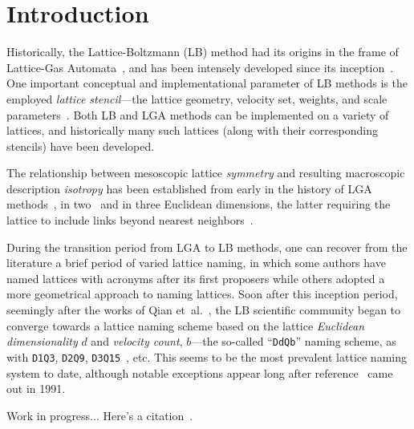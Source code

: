 \section{Introduction}

    Historically,   the   Lattice-Boltzmann   (LB)    method    had    its    origins    in    the    frame    of    Lattice-Gas
    Automata~\cite{1988-McNamaraGR+ZanettiG-PhysRevLett},     and     has     been     intensely     developed     since     its
    inception~\cite{2018-KrugerT+ViggenEM-Springer}. One important conceptual and implementational parameter of  LB  methods  is
    the    employed    \emph{lattice    stencil}---the    lattice    geometry,    velocity    set,    weights,     and     scale
    parameters~\cite{2013-HegeleJr+PhilippiPC-JSciComput,                                2013-MattilaKK+PhilippiPC-IntJModPhysC,
    2014-MattilaKK+PhilippiPC-SciWorldJ}. Both LB and LGA methods can be implemented on a variety of lattices, and  historically
    many such lattices (along with their corresponding stencils) have been developed.

    The relationship between mesoscopic lattice \emph{symmetry} and resulting macroscopic description \emph{isotropy}  has  been
    established from early in the history of LGA methods~\cite{1973-HardyJ+PazzisO-JMathPhys, 1976-HardyJ+PomeauY-PhysRevA},  in
    two~\cite{1986-FrischU+PomeauY-PhysRevLett} and in three Euclidean dimensions, the latter requiring the lattice  to  include
    links beyond nearest neighbors~\cite[p.~473]{1986-WolframS-JStatPhys}.

    During the transition period from LGA to LB methods, one can recover from the literature a brief period  of  varied  lattice
    naming, in which some authors have named lattices with acronyms after its  first  proposers  while  others  adopted  a  more
    geometrical  approach  to  naming  lattices.  Soon  after  this  inception  period,  seemingly  after  the  works  of   Qian
    et~al.~\cite{1991-QianYH+LallemandP-AdvKinTheoContMech, 1992-QianYH+LallemandP-EurophysLett}, the  LB  scientific  community
    began to  converge  towards  a  lattice  naming  scheme  based  on  the  lattice  \emph{Euclidean  dimensionality}  $d$  and
    \emph{velocity  count},  $b$---the  so-called  ``\texttt{DdQb}''  naming  scheme,  as  with  \texttt{D1Q3},   \texttt{D2Q9},
    \texttt{D3Q15}~\cite{1992-QianYH+LallemandP-EurophysLett}, etc. This seems to be the most prevalent lattice naming system to
    date, although notable exceptions appear long after reference~\cite{1991-QianYH+LallemandP-AdvKinTheoContMech} came  out  in
    1991.

    Work in progress... Here's a citation~\cite{2016-PhilippiPC+MattilaKK-JBrazSocMechSci}.

